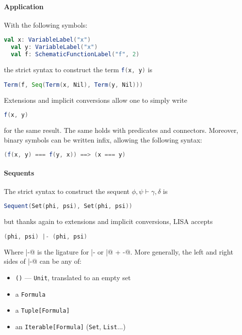 \paragraph{Application}
With the following symbols:
\begin{lstlisting}[language=Scala]
  val x: VariableLabel("x")
  val y: VariableLabel("x")
  val f: SchematicFunctionLabel("f", 2)
\end{lstlisting}
the strict syntax to construct the term \lstinline[language=Scala]|f(x, y)| is
\begin{lstlisting}[language=Scala]
  Term(f, Seq(Term(x, Nil), Term(y, Nil)))
\end{lstlisting}
Extensions and implicit conversions allow one to simply write
\begin{lstlisting}[language=Scala]
  f(x, y)
\end{lstlisting}
for the same result. The same holds with predicates and connectors. Moreover, binary symbols can be written infix, allowing the following syntax:

\begin{lstlisting}[language=Scala]
  (f(x, y) === f(y, x)) ==> (x === y)
\end{lstlisting}

\paragraph{Sequents}
The strict syntax to construct the sequent $\phi, \psi \vdash \gamma, \delta$ is
\begin{lstlisting}[language=Scala]
  Sequent(Set(phi, psi), Set(phi, psi))
\end{lstlisting}
but thanks again to  extensions and implicit conversions, LISA accepts
\begin{lstlisting}[language=Scala]
  (phi, psi) |- (phi, psi)
\end{lstlisting}
Where \lstinline@|-@ is the ligature for { |- } or \lstinline@|@ + \lstinline@-@. More generally, the left and right sides of \lstinline@|-@ can be any of:
\vspace*{-0.7em}
\begin{itemize}
  \setlength\itemsep{-0.5em}
  \item \lstinline|()| --- \lstinline|Unit|, translated to an empty set
  \item a \lstinline|Formula|
  \item a \lstinline|Tuple[Formula]|
  \item an \lstinline|Iterable[Formula]| (\lstinline|Set|, \lstinline|List|...)
\end{itemize}
